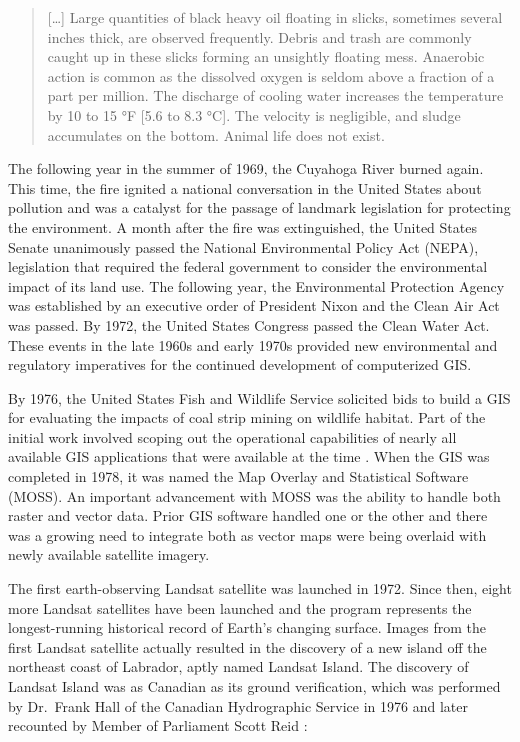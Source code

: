 \documentclass[
]{book}
\begin{document}
\begin{quote}
{[}\ldots{]} Large quantities of black heavy oil floating in slicks, sometimes several inches thick, are observed frequently. Debris and trash are commonly caught up in these slicks forming an unsightly floating mess. Anaerobic action is common as the dissolved oxygen is seldom above a fraction of a part per million. The discharge of cooling water increases the temperature by 10 to 15 °F {[}5.6 to 8.3 °C{]}. The velocity is negligible, and sludge accumulates on the bottom. Animal life does not exist.
\end{quote}

The following year in the summer of 1969, the Cuyahoga River burned again. This time, the fire ignited a national conversation in the United States about pollution and was a catalyst for the passage of landmark legislation for protecting the environment. A month after the fire was extinguished, the United States Senate unanimously passed the National Environmental Policy Act (NEPA), legislation that required the federal government to consider the environmental impact of its land use. The following year, the Environmental Protection Agency was established by an executive order of President Nixon and the Clean Air Act was passed. By 1972, the United States Congress passed the Clean Water Act. These events in the late 1960s and early 1970s provided new environmental and regulatory imperatives for the continued development of computerized GIS.

By 1976, the United States Fish and Wildlife Service solicited bids to build a GIS for evaluating the impacts of coal strip mining on wildlife habitat. Part of the initial work involved scoping out the operational capabilities of nearly all available GIS applications that were available at the time \citep{usfws_1977}. When the GIS was completed in 1978, it was named the Map Overlay and Statistical Software (MOSS). An important advancement with MOSS was the ability to handle both raster and vector data. Prior GIS software handled one or the other and there was a growing need to integrate both as vector maps were being overlaid with newly available satellite imagery.

The first earth-observing Landsat satellite was launched in 1972. Since then, eight more Landsat satellites have been launched and the program represents the longest-running historical record of Earth's changing surface. Images from the first Landsat satellite actually resulted in the discovery of a new island off the northeast coast of Labrador, aptly named Landsat Island. The discovery of Landsat Island was as Canadian as its ground verification, which was performed by Dr.~Frank Hall of the Canadian Hydrographic Service in 1976 and later recounted by Member of Parliament Scott Reid \citep{reid_parliamentary_2001}:
\end{document}
